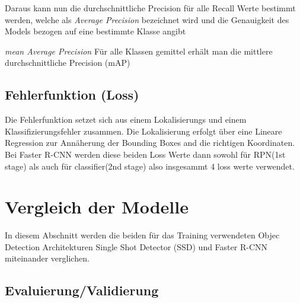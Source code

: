 Daraus kann nun die durchschnittliche Precision für alle Recall 
Werte bestimmt werden, welche als \textit{Average Precision}
bezeichnet wird und die Genauigkeit des Models bezogen auf 
eine bestimmte Klasse angibt

\textit{mean Average Precision}
Für alle Klassen gemittel 
erhält man die mittlere durchschnittliche Precision (mAP)



\subsection*{Fehlerfunktion (Loss)}
Die Fehlerfunktion setzet sich aus einem Lokalisierungs und einem 
Klassifizierungsfehler zusammen. 
Die Lokalisierung erfolgt über eine Lineare Regression zur 
Annäherung der Bounding Boxes and die richtigen Koordinaten.\\

Bei Faster R-CNN werden diese beiden Loss Werte dann sowohl für 
RPN(1st stage) als auch für classifier(2nd stage) also 
insgesammt 4 loss werte verwendet.



\section{Vergleich der Modelle}\label{sec:model_vergleich}
In diesem Abschnitt werden die beiden für das Training verwendeten
Objec Detection Architekturen Single Shot Detector (SSD)
und Faster R-CNN miteinander verglichen.



\subsection{Evaluierung/Validierung}

